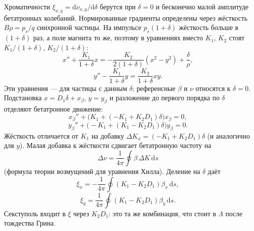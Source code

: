Хроматичности $\xi_{x,y}=\mathrm{d}\nu_{x,y}/\mathrm{d}\delta$ берутся при $\delta=0$ и бесконечно малой амплитуде бетатронных колебаний. Нормированные градиенты определены через жёсткость $B\rho=p_s/q$ синхронной частицы. На импульсе $p_s(1+\delta)$ жёсткость больше в $(1+\delta)$ раз, а поле магнита то же, поэтому в уравнениях вместо $K_1$, $K_2$ стоят $K_1/(1+\delta)$, $K_2/(1+\delta)$:
\begin{equation}
\label{eq:hill-d}
x''+\frac{K_1}{1+\delta}x
=-\frac{K_2}{2(1+\delta)}(x^2-y^2)+\frac{\delta}{\rho},
\end{equation}
\begin{equation}
\label{eq:hill-y}
y''-\frac{K_1}{1+\delta}y
=\frac{K_2}{1+\delta}xy.
\end{equation}
Эти уравнения --- для частицы с данным $\delta$; референсные $\beta$ и $\nu$ относятся к $\delta=0$. Подстановка $x=D_1\delta+x_\beta$, $y=y_\beta$ и разложение до первого порядка по $\delta$ отделяют бетатронное движение:
\begin{equation}
\label{eq:xbeta-chrom}
x_\beta''+\bigl(K_1+(-K_1+K_2 D_1)\delta\bigr)x_\beta=0,
\end{equation}
\begin{equation}
\label{eq:ybeta-chrom}
y_\beta''+\bigl(-K_1+(K_1-K_2 D_1)\delta\bigr)y_\beta=0.
\end{equation}
Жёсткость отличается от $K_1$ на добавку $\Delta K_x=(-K_1+K_2D_1)\delta$ (и аналогично для $y$). Малая добавка к жёсткости сдвигает бетатронную частоту на
\begin{equation}
\label{eq:dnu}
\Delta\nu=\frac{1}{4\pi}\oint\beta\,\Delta K\,\mathrm{d}s
\end{equation}
(формула теории возмущений для уравнения Хилла). Деление на $\delta$ даёт
\begin{equation}
\label{eq:xi-x}
\xi_x
=-\frac{1}{4\pi}\oint(K_1-K_2 D_1)\beta_x\,\mathrm{d}s,
\end{equation}
\begin{equation}
\label{eq:xi-y}
\xi_y
=\frac{1}{4\pi}\oint(K_1-K_2 D_1)\beta_y\,\mathrm{d}s.
\end{equation}
Секступоль входит в $\xi$ через $K_2D_1$: это та же комбинация, что стоит в $\Lambda$ после тождества Грина.


